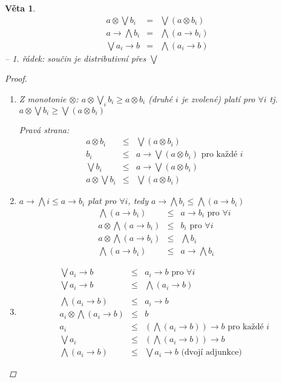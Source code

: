 \documentclass[10pt, a4paper, titlepage]{article}
\theoremstyle{note}
\newtheorem{veta}{Věta}
\begin{document}
\begin{veta}\label{v10}
\begin{eqnarray}
a\otimes \bigvee b_{i} &=&\bigvee(a\otimes b_{i}) \nonumber\\
a\rightarrow\bigwedge b_{i} &=&\bigwedge(a\rightarrow b_{i})\nonumber\\
\bigvee a_{i} \rightarrow b &=&\bigwedge(a_{i}\rightarrow b) \nonumber
\end{eqnarray}
-- 1. řádek: součin je distributivní přes $\bigvee$
\begin{proof}
\begin{enumerate}
\item Z monotonie $\otimes$: $a\otimes \bigvee_{i} b_{i}  \geq a\otimes b_{i}$ (druhé $i$ je zvolené) platí pro $\forall i$ tj. $a\otimes\bigvee b_{i} \geq \bigvee(a\otimes b_{i})$

Pravá strana:\begin{eqnarray}
a\otimes b_{i}&\leq& \bigvee(a\otimes b_{i})\nonumber \\
b_{i}&\leq&a\rightarrow\bigvee(a\otimes b_{i}) \text{ pro každé }i\nonumber \\
\bigvee b_{i}&\leq&a\rightarrow\bigvee(a\otimes b_{i})\nonumber\\
a\otimes \bigvee b_{i}&\leq&\bigvee(a\otimes b_{i})\nonumber
\end{eqnarray}
\item $a\rightarrow \bigwedge{i} \leq a\rightarrow b_{i}$ plat pro $\forall i$, tedy $a\rightarrow \bigwedge b_{i} \leq \bigwedge(a\rightarrow b_{i})$
\begin{eqnarray}
\bigwedge(a\rightarrow b_{i})&\leq& a\rightarrow b_{i} \text{ pro } \forall i\nonumber\\
a\otimes \bigwedge(a\rightarrow b_{i})&\leq& b_{i} \text{ pro } \forall i\nonumber\\
a\otimes \bigwedge(a\rightarrow b_{i})&\leq& \bigwedge b_{i} \nonumber\\
\bigwedge(a\rightarrow b_{i})&\leq& a\rightarrow \bigwedge b_{i} \nonumber
\end{eqnarray}
\item \begin{eqnarray}
\bigvee a_{i} \rightarrow b&\leq&a_{i}\rightarrow b \text{ pro } \forall i\nonumber\\
\bigvee a_{i} \rightarrow b&\leq& \bigwedge(a_{i}\rightarrow b) \nonumber\\\nonumber\\
\bigwedge(a_{i}\rightarrow b)&\leq& a_{i}\rightarrow b\nonumber\\
a_{i}\otimes \bigwedge(a_{i}\rightarrow b)&\leq&b\nonumber\\
a_{i} &\leq&(\bigwedge(a_{i}\rightarrow b)) \rightarrow b \text{ pro každé }i \nonumber\\
\bigvee a_{i} &\leq&(\bigwedge(a_{i}\rightarrow b)) \rightarrow b \nonumber\\
\bigwedge(a_{i}\rightarrow b) &\leq&\bigvee a_{i}\rightarrow b\text{   (dvojí adjunkce)} \nonumber
\end{eqnarray}
\end{enumerate}
\end{proof}
\end{veta}
\end{document}
